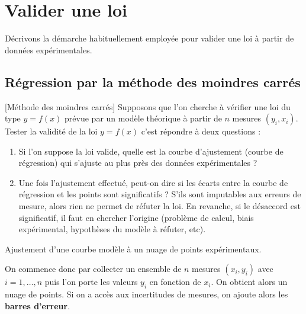 	
\section{Valider une loi}
Décrivons la démarche habituellement employée pour valider une loi à partir de données expérimentales.

\subsection{Régression par la méthode des moindres carrés}[Méthode des moindres carrés]
Supposons que l'on cherche à vérifier une loi du type $y=f(x)$ prévue par un modèle théorique à partir de $n$ mesures $(y_i,x_i)$. Tester la validité de la loi $y=f(x)$ c'est répondre à deux questions :
\begin{enumerate}
	\item Si l'on suppose la loi valide, quelle est la courbe d'ajustement (courbe de régression) qui s'ajuste au plus près des données expérimentales ?
	\item Une fois l'ajustement effectué, peut-on dire si les écarts entre la courbe de régression et les points sont significatifs ? S'ils sont imputables aux erreurs de mesure, alors rien ne permet de réfuter la loi. En revanche, si le désaccord est significatif, il faut en chercher l'origine (problème de calcul, biais expérimental, hypothèses du modèle à réfuter, etc).
\end{enumerate}
\begin{marginfigure}
\centering
	\caption{Ajustement d'une courbe modèle à un nuage de points expérimentaux.}
\end{marginfigure}
On commence donc par collecter un ensemble de $n$ mesures $(x_i,y_i)$ avec $i=1,\ldots, n$ puis l'on porte les valeurs $y_i$ en fonction de $x_i$.  On obtient  alors un nuage de points. Si on a accès aux incertitudes de mesures, on ajoute alors les \textbf{barres d'erreur}.


